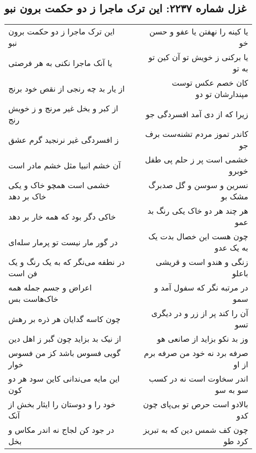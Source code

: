 \begin{center}
\section*{غزل شماره ۲۲۳۷: این ترک ماجرا ز دو حکمت برون نبو}
\label{sec:2237}
\begin{longtable}{l p{0.5cm} r}
این ترک ماجرا ز دو حکمت برون نبو
&&
یا کینه را نهفتن یا عفو و حسن خو
\\
یا آنک ماجرا نکنی به هر فرصتی
&&
یا برکنی ز خویش تو آن کین تو به تو
\\
از یار بد چه رنجی از نقص خود برنج
&&
کان خصم عکس توست مپندارشان تو دو
\\
از کبر و بخل غیر مرنج و ز خویش رنج
&&
زیرا که از دی آمد افسردگی جو
\\
ز افسردگی غیر نرنجید گرم عشق
&&
کاندر تموز مردم تشنه‌ست برف جو
\\
آن خشم انبیا مثل خشم مادر است
&&
خشمی است پر ز حلم پی طفل خوبرو
\\
خشمی است همچو خاک و یکی خاک بر دهد
&&
نسرین و سوسن و گل صدبرگ مشک بو
\\
خاکی دگر بود که همه خار بر دهد
&&
هر چند هر دو خاک یکی رنگ بد عمو
\\
در گور مار نیست تو پرمار سله‌ای
&&
چون هست این خصال بدت یک به یک عدو
\\
در نطفه می‌نگر که به یک رنگ و یک فن است
&&
زنگی و هندو است و قریشی باعلو
\\
اعراض و جسم جمله همه خاک‌هاست بس
&&
در مرتبه نگر که سفول آمد و سمو
\\
چون کاسه گدایان هر ذره بر رهش
&&
آن را کند پر از زر و در دیگری تسو
\\
از نیک بد بزاید چون گبر ز اهل دین
&&
وز بد نکو بزاید از صانعی هو
\\
گویی فسوس باشد کز من فسوس خوار
&&
صرفه برد نه خود من صرفه برم از او
\\
این مایه می‌ندانی کاین سود هر دو کون
&&
اندر سخاوت است نه در کسب سو به سو
\\
خود را و دوستان را ایثار بخش از آنک
&&
بالادو است حرص تو بی‌پای چون کدو
\\
در جود کن لجاج نه اندر مکاس و بخل
&&
چون کف شمس دین که به تبریز کرد طو
\\
\end{longtable}
\end{center}
